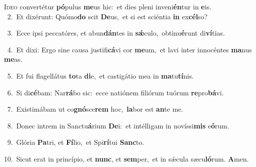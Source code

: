 \lettrine{\initial\textcolor{\initialcolor}{I}}{deo} convertétur \textbf{pó}\-pulus \textbf{me}\-us hic:~\star et dies pleni inveni\-\textbf{én}\-tur in \textbf{e}\-is.\\
{\numbfont\textcolor{\numbcolor}{~2.}}~Et dixérunt: Quómo\textbf{do} scit \textbf{De}\-us,~\star et si est sciéntia \textbf{in} ex\-\textbf{cél}\-so?\par
{\numbfont\textcolor{\numbcolor}{~3.}}~Ecce ipsi peccatóres, et abun\-\textbf{dán}\-tes in \textbf{sǽ}\-culo,~\star obtinu\-\textbf{é}\-runt di\-\textbf{ví}\-tias.\par
{\numbfont\textcolor{\numbcolor}{~4.}}~Et dixi: Ergo sine causa justifi\-\textbf{cá}\-vi cor \textbf{me}\-um,~\star et lavi inter innocéntes \textbf{ma}\-nus \textbf{me}\-as.\par
{\numbfont\textcolor{\numbcolor}{~5.}}~Et fui flagellátus \textbf{to}\-ta \textbf{di}\-e,~\star et castigátio mea in \textbf{ma}\-tu\-\textbf{tí}\-nis.\par
{\numbfont\textcolor{\numbcolor}{~6.}}~Si di\-\textbf{cé}\-bam: Nar\-\textbf{rá}\-bo sic:~\star ecce natiónem filiórum tuórum \textbf{re}\-pro\-\textbf{bá}\-vi.\par
{\numbfont\textcolor{\numbcolor}{~7.}}~Existimábam ut co\-\textbf{gnó}\-sce\textbf{rem} hoc,~\star \textbf{la}\-bor est \textbf{an}\-te me.\par
{\numbfont\textcolor{\numbcolor}{~8.}}~Donec intrem in Sanctu\-\textbf{á}\-rium \textbf{De}\-i:~\star et intélligam in novíssi\textbf{mis} e\-\textbf{ó}\-rum.\par
{\numbfont\textcolor{\numbcolor}{~9.}}~Glória \textbf{Pa}\-tri, et \textbf{Fí}\-lio,~\star et Spi\-\textbf{rí}\-tui \textbf{Sanc}\-to.\par
{\numbfont\textcolor{\numbcolor}{10.}}~Sicut erat in princípio, et \textbf{nunc}\-, et \textbf{sem}\-per,~\star et in sǽcula sæcu\-\textbf{ló}\-rum. \textbf{A}\-men.\par
